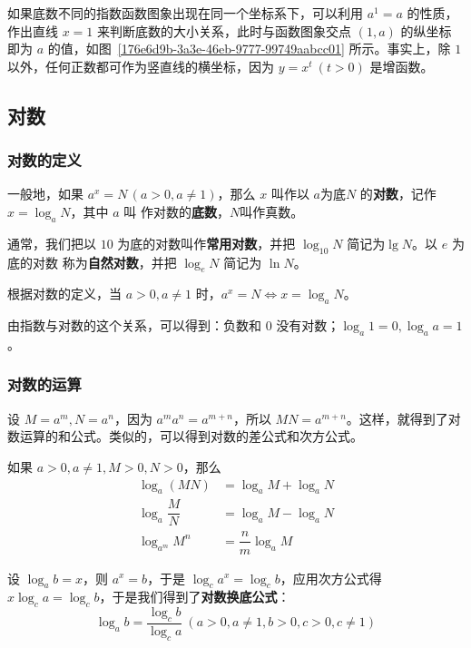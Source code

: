 \documentclass[a4paper,openany]{ctexbook}
\begin{document}
如果底数不同的指数函数图象出现在同一个坐标系下，可以利用 \(a^1=a\) 的性质，作出直线 \(x=1\) 来判断底数的大小关系，此时与函数图象交点 \((1,a)\) 的纵坐标
即为 \(a\) 的值，如图~\ref{176e6d9b-3a3e-46eb-9777-99749aabcc01} 所示。事实上，除 \(1\) 以外，任何正数都可作为竖直线的横坐标，因为 \(y=x^t\ (t>0)\) 是增函数。

\subsection{对数}

\subsubsection{对数的定义}

一般地，如果 \(a^x=N\,(a>0,a\ne 1)\)，那么 \(x\) 叫作以 \(a\)为底\(N\) 的\textbf{对数}，记作 \(x=\log_a N\)，其中 \(a\) 叫
作对数的\textbf{底数}，\(N\)叫作真数。

通常，我们把以 \(10\) 为底的对数叫作\textbf{常用对数}，并把 \(\log_{10} N\) 简记为\(\lg N\)。以 \(e\) 为底的对数
称为\textbf{自然对数}，并把 \(\log_e N\) 简记为 \(\ln N\)。

根据对数的定义，当 \(a>0,a\ne 1\) 时，\(a^x=N \Leftrightarrow x=\log_a N\)。

由指数与对数的这个关系，可以得到：负数和 \(0\) 没有对数；\(\log_a 1=0,\log_a a=1\)。

\subsubsection{对数的运算}

设 \(M=a^m,N=a^n\)，因为 \(a^m a^n=a^{m+n}\)，所以 \(MN=a^{m+n}\)。这样，就得到了对数运算的和公式。类似的，可以得到对数的差公式和次方公式。

如果 \(a>0,a\ne 1, M>0,N>0\)，那么
\begin{align*}
    \log_a(MN)          & =\log_a M+\log_a N     \\
    \log_a \dfrac{M}{N} & = \log_a M - \log_a N  \\
    \log_{a^m} M^n      & = \dfrac{n}{m}\log_a M
\end{align*}

设 \(\log_a b=x\)，则 \(a^x=b\)，于是 \(\log_c a^x=\log_c b\)，应用次方公式得 \(x\log_c a=\log_c b\)，于是我们得到了\textbf{对数换底公式}：
\[
    \log_a b=\dfrac{\log_c b}{\log_c a}\ (a>0,a\ne 1,b>0,c>0,c\ne 1)
\]
\end{document}
